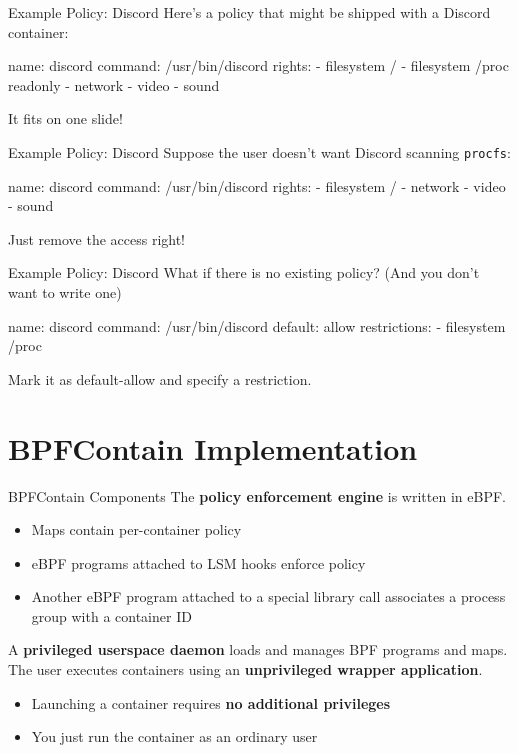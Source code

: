 \documentclass[12pt, dvipsnames, aspectratio=169]{beamer}
\begin{document}
\begin{frame}[c, fragile]{Example Policy: Discord}
Here's a policy that might be shipped with a Discord container:
\vfill
\begin{listing}[language=yaml]
name: discord
command: /usr/bin/discord
rights:
  - filesystem /
  - filesystem /proc readonly
  - network
  - video
  - sound
\end{listing}
\vfill
It fits on one slide!
\end{frame}

\begin{frame}[c, fragile]{Example Policy: Discord}
Suppose the user doesn't want Discord scanning \texttt{procfs}:
\vfill
\begin{listing}[language=yaml]
name: discord
command: /usr/bin/discord
rights:
  - filesystem /
  - network
  - video
  - sound
\end{listing}
\vfill
Just remove the access right!
\end{frame}

\begin{frame}[c, fragile]{Example Policy: Discord}
What if there is no existing policy? (And you don't want to write one)
\vfill
\begin{listing}[language=yaml]
name: discord
command: /usr/bin/discord
default: allow
restrictions:
  - filesystem /proc
\end{listing}
\vfill
Mark it as default-allow and specify a restriction.
\end{frame}

\section{BPFContain Implementation}

\begin{frame}[c]{BPFContain Components}
The \textbf{policy enforcement engine} is written in eBPF.
\begin{itemize}
  \item Maps contain per-container policy
  \item eBPF programs attached to LSM hooks enforce policy
  \item Another eBPF program attached to a special library call associates a process group
  with a container ID
\end{itemize}
\vfill
A \textbf{privileged userspace daemon} loads and manages BPF programs and maps.
\vfill
The user executes containers using an \textbf{unprivileged wrapper application}.
\begin{itemize}
  \item Launching a container requires \textbf{no additional privileges}
  \item You just run the container as an ordinary user
\end{itemize}
\end{frame}
\end{document}
